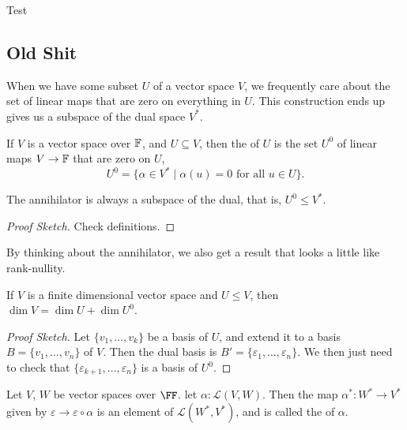 \documentclass[a4paper]{scrartcl}
\begin{document}
Test

\subsection{Old Shit}


When we have some subset $U$ of a vector space $V$, we frequently care about the set of linear maps that are zero on everything in $U$. This construction ends up gives us a subspace of the dual space $V^*$.


\begin{definition}[Annihilator]
    If $V$ is a vector space over $\mathbb{F}$, and $U \subseteq V$, then the  of $U$ is the set $U^0$ of linear maps $V \rightarrow \mathbb{F}$ that are zero on $U$,
    $$
    U^0 = \{ \alpha \in V^* \mid \alpha(u) = 0 \text{ for all }u \in U\}.
    $$
\end{definition}

\begin{lemma}
    The annihilator is always a subspace of the dual, that is, $U^0 \leq V^*$.
\end{lemma}
\begin{proof}[Proof Sketch]    
    Check definitions.
\end{proof}

By thinking about the annihilator, we also get a result that looks a little like rank-nullity.

\begin{lemma}
    If $V$ is a finite dimensional vector space and $U \leq V$, then $\dim V = \dim U + \dim U^0$.
\end{lemma}
\begin{proof}[Proof Sketch]
    Let $\{v_1, \dots, v_k\}$ be a basis of $U$, and extend it to a basis $B = \{v_1, \dots, v_n\}$ of $V$. Then the dual basis is $B' = \{\varepsilon_1, \dots, \varepsilon_n\}$.
    We then just need to check that $\{\varepsilon_{k + 1}, \dots, \varepsilon_n\}$ is a basis of $U^0$.
\end{proof}

\begin{definition}
    Let $V$, $W$ be vector spaces over $\FF$. let $\alpha : \mathcal{L}(V, W)$. Then the map $\alpha^*: W^* \rightarrow V^*$ given by $\varepsilon \rightarrow \varepsilon \circ \alpha$ is an element of $\mathcal{L}(W^*, V^*)$, and is called the  of $\alpha$.
\end{definition}
\end{document}
